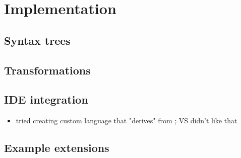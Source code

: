 \chapter{Implementation}

\section{Syntax trees}

\section{Transformations}

\section{IDE integration}

\begin{itemize}
\item tried creating custom language that "derives" from ; VS didn't like that
\end{itemize}

\section{Example extensions}